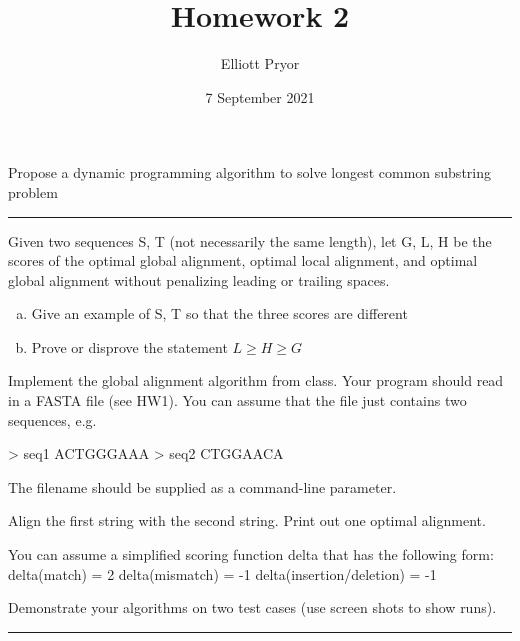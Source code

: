 \documentclass[11pt]{article}
\title{Homework 2}
\author{Elliott Pryor}
\date{7 September 2021}
\begin{document}
\maketitle


Propose a dynamic programming algorithm to solve longest common substring problem
\hrule



Given two sequences S, T (not necessarily the same length), let G, L, H be the scores of the
optimal global alignment, optimal local alignment, and optimal global alignment without penalizing leading or trailing spaces.


\begin{enumerate}[a)]
    \item Give an example of S, T so that the three scores are different
    \item Prove or disprove the statement $L \geq H \geq G$
\end{enumerate}



Implement the global alignment algorithm from class.  Your program should read in a FASTA file (see HW1).  You can assume that the file just contains two sequences, e.g.

> seq1
ACTGGGAAA
> seq2
CTGGAACA

The filename should be supplied as a command-line parameter.

Align the first string with the second string.  Print out one optimal alignment.

You can assume a simplified scoring function delta that has the following form:
delta(match) = 2
delta(mismatch) = -1
delta(insertion/deletion) = -1

Demonstrate your algorithms on two test cases (use screen shots to show runs). 

\hrule



\lstset{style=mystyle}

\end{document}
